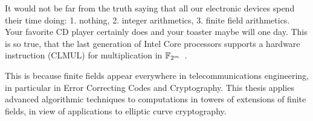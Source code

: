 




It would not be far from the truth saying that all our electronic
devices spend their time doing: 1. nothing, 2. integer arithmetics, 3.
finite field arithmetics. Your favorite CD player certainly does and
your toaster maybe will one day. This is so true, that the last
generation of Intel Core processors supports a hardware instruction
(CLMUL) for multiplication in $\mathbb{F}_{2^m}$~\cite{intel-carryless}.

This is because finite fields appear everywhere in telecommunications
engineering, in particular in Error Correcting Codes and
Cryptography. This thesis applies advanced algorithmic techniques to
computations in towers of extensions of finite fields, in view of
applications to elliptic curve cryptography.



